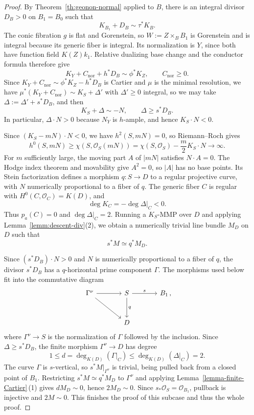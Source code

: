 \documentclass[10pt,abstract=true]{scrartcl}
\numberwithin{equation}{section}
\theoremstyle{definition}
\theoremstyle{remark}
\begin{document}
\begin{proof}
  By Theorem~\ref{th:geonon-normal} applied to $B$, there is an integral divisor $D_B> 0$ on $B_1=B_0$ such that
  \[
    K_{B_1}+D_B\sim\tau^*K_B.
  \]
  The conic fibration $g$ is flat and Gorenstein, so $W:=Z\times_B B_1$ is Gorenstein and is integral because its generic fiber is integral.
  Its normalization is $Y$, since both have function field $K(Z)k_1$.
  Relative dualizing base change and the conductor formula therefore give
  \[
    K_Y+C_{\mathrm{nor}}+h^*D_B\sim\phi^*K_Z,
    \qquad C_{\mathrm{nor}}\ge0.
  \]
  Since $K_Y+C_{\mathrm{nor}}\sim\phi^*K_Z-h^*D_B$ is Cartier and $\mu$ is the minimal resolution, we have $\mu^*(K_Y+C_{\mathrm{nor}})\sim K_S+\Delta'$ with $\Delta'\geq0$ integral, so we may take $\Delta:=\Delta'+s^*D_B$, and then
  \[
    K_S+\Delta\sim-N,
    \qquad \Delta\ge s^*D_B.
  \]
  In particular, $\Delta\cdot N>0$ because $N_Y$ is $h$-ample, and hence $K_S\cdot N<0$.

  Since $(K_S-mN)\cdot N<0$, we have $h^2(S,mN)=0$, so Riemann--Roch gives
  \[
    h^0(S,mN)\geq\chi(S,\mathcal O_S(mN))
      =\chi(S,\mathcal O_S)-\frac m2K_S\cdot N\to\infty.
  \]
  For $m$ sufficiently large, the moving part $A$ of $|mN|$ satisfies $N\cdot A=0$.
  The Hodge index theorem and movability give $A^2=0$, so $|A|$ has no base points.
  Its Stein factorization defines a morphism $q\colon S\to D$ to a regular projective curve, with $N$ numerically proportional to a fiber of $q$.
  The generic fiber $C$ is regular with $H^0(C,\mathcal O_C)=K(D)$, and
  \[
    \deg K_C=-\deg\Delta|_C<0.
  \]
  Thus $p_a(C)=0$ and $\deg\Delta|_C=2$.
  Running a $K_S$-MMP over $D$ and applying Lemma~\ref{lemm:descent-div}\textup{(2)}, we obtain a numerically trivial line bundle $M_D$ on $D$ such that
  \[
    s^*M\simeq q^*M_D.
  \]

  Since $(s^*D_B)\cdot N>0$ and $N$ is numerically proportional to a fiber of $q$, the divisor $s^*D_B$ has a $q$-horizontal prime component $\Gamma$.
  The morphisms used below fit into the commutative diagram
  \[
    \begin{tikzcd}[column sep=large,row sep=large]
      \Gamma^\nu \ar[r] \ar[dr] & S \ar[r,"s"] \ar[d,"q"] & B_1\rlap{\,,} \\
      & D &
    \end{tikzcd}
  \]
  where $\Gamma^\nu\to S$ is the normalization of $\Gamma$ followed by the inclusion.
  Since $\Delta\geq s^*D_B$, the finite morphism $\Gamma^\nu\to D$ has degree
  \[
    1\leq d=\deg_{K(D)}(\Gamma|_C)\leq\deg_{K(D)}(\Delta|_C)=2.
  \]
  The curve $\Gamma$ is $s$-vertical, so $s^*M|_{\Gamma^\nu}$ is trivial, being pulled back from a closed point of $B_1$.
  Restricting $s^*M\simeq q^*M_D$ to $\Gamma^\nu$ and applying Lemma~\ref{lemma-finite-Cartier}\,\textup{(1)} gives $dM_D\sim0$, hence $2M_D\sim0$.
  Since $s_*\mathcal O_S=\mathcal O_{B_1}$, pullback is injective and $2M\sim0$.
  This finishes the proof of this subcase and thus the whole proof.
\end{proof}
\end{document}
